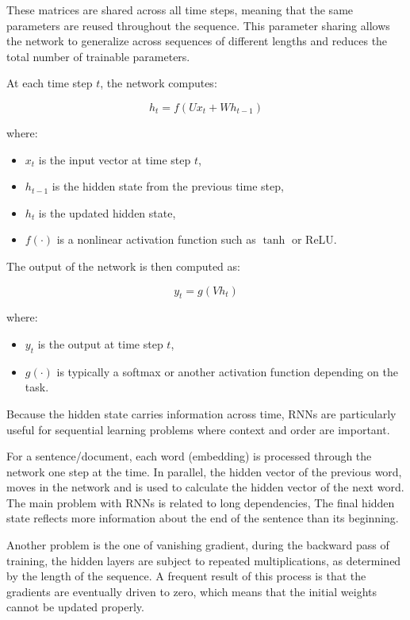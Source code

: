 These matrices are shared across all time steps, meaning that the same parameters
are reused throughout the sequence. This parameter sharing allows the network to
generalize across sequences of different lengths and reduces the total number of
trainable parameters.

At each time step $t$, the network computes:

\[
h_t = f(Ux_t + Wh_{t-1})
\]

where:

\begin{itemize}
    \item $x_t$ is the input vector at time step $t$,
    \item $h_{t-1}$ is the hidden state from the previous time step,
    \item $h_t$ is the updated hidden state,
    \item $f(\cdot)$ is a nonlinear activation function such as $\tanh$ or ReLU.
\end{itemize}

The output of the network is then computed as:

\[
y_t = g(Vh_t)
\]

where:

\begin{itemize}
    \item $y_t$ is the output at time step $t$,
    \item $g(\cdot)$ is typically a softmax or another activation function depending
    on the task.
\end{itemize}

Because the hidden state carries information across time, RNNs are particularly useful
for sequential learning problems where context and order are important. 

\vspace{10pt}

For a sentence/document, each word (embedding) is processed through the network one step at the time. In parallel, the hidden vector of the previous word, moves in the network and is used to calculate the hidden vector of the next word. The main problem with RNNs is related to long dependencies, The final hidden state reflects more information about the end of the sentence than its beginning. 

\vspace{10pt}

Another problem is the one of vanishing gradient, during the backward pass of training, the hidden layers are subject to repeated multiplications, as determined by the length of the sequence. A frequent result of this process is that the gradients are eventually driven to zero, which means that the initial weights cannot be updated properly. 


